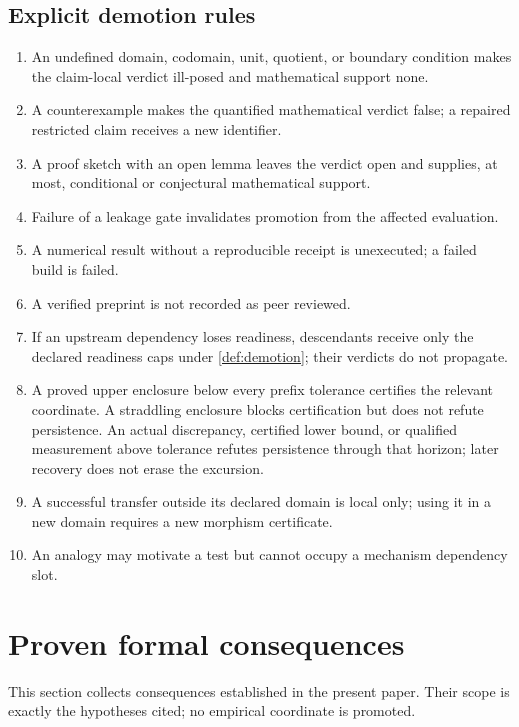 \documentclass[11pt,a4paper]{article}
\theoremstyle{definition}
\theoremstyle{plain}
\theoremstyle{remark}
\begin{document}
\endgroup

\subsection{Explicit demotion rules}

\begin{enumerate}
\item An undefined domain, codomain, unit, quotient, or boundary condition
makes the claim-local verdict ill-posed and mathematical support none.
\item A counterexample makes the quantified mathematical verdict false; a
repaired restricted claim receives a new identifier.
\item A proof sketch with an open lemma leaves the verdict open and supplies,
at most, conditional or conjectural mathematical support.
\item Failure of a leakage gate invalidates promotion from the affected
evaluation.
\item A numerical result without a reproducible receipt is unexecuted; a failed
build is failed.
\item A verified preprint is not recorded as peer reviewed.
\item If an upstream dependency loses readiness, descendants receive only the
declared readiness caps under \cref{def:demotion}; their verdicts do not
propagate.
\item A proved upper enclosure below every prefix tolerance certifies the
relevant coordinate.  A straddling enclosure blocks certification but does
not refute persistence.  An actual discrepancy, certified lower bound, or
qualified measurement above tolerance refutes persistence through that
horizon; later recovery does not erase the excursion.
\item A successful transfer outside its declared domain is local only; using it
in a new domain requires a new morphism certificate.
\item An analogy may motivate a test but cannot occupy a mechanism dependency
slot.
\end{enumerate}

\section{Proven formal consequences}\label{sec:consequences}

This section collects consequences established in the present paper.  Their
scope is exactly the hypotheses cited; no empirical coordinate is promoted.
\end{document}

